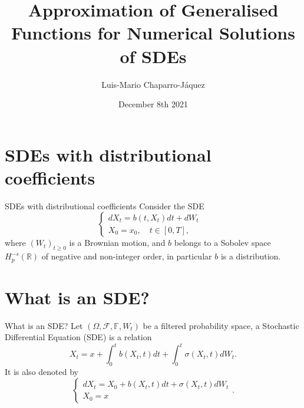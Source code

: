\documentclass{beamer}
\title{Approximation of Generalised Functions for Numerical Solutions of SDEs}
\author{Luis-Mario Chaparro-Jáquez}
\institute{University of Leeds\\School of Mathematics}
\date{December 8th 2021}
\begin{document}
\frame{\titlepage}
\frame{\tableofcontents}
\section{SDEs with distributional coefficients}
\begin{frame}{SDEs with distributional coefficients}
        Consider the SDE%
        \begin{equation*}
                \label{eq:distributional_sde}
                \begin{cases}
                        dX_t = b(t, X_t) dt + dW_t
                        &
                        \\
                        X_0 = x_0, \quad t \in [0,T],
                \end{cases}
        \end{equation*}
        where
        $(W_t)_{t \geq 0}$
        is a Brownian motion, and
        $b$
        belongs to a Sobolev space
        $H^{-s}_p(\mathbb{R})$
        of negative and non-integer order, in particular
        $b$
is a distribution.
\end{frame}

\section{What is an SDE?}
\begin{frame}{What is an SDE?}
        Let
        $ (\Omega, \mathcal{F}, \mathbb{F}, W_{t}) $
        be a filtered probability space, a Stochastic Differential Equation (SDE) is a relation
        \begin{equation*}
                \label{eq:sde}
                X_{t} = x + \int_{0}^{t} b(X_{t}, t) dt + \int_{0}^{t} \sigma(X_{t}, t) dW_{t}.
        \end{equation*}
        \pause
        {\color{red}
        It is also denoted by
        \begin{equation*}
                \begin{cases}
                        dX_{t} = X_{0} + b(X_{t}, t) dt + \sigma(X_{t}, t) dW_{t}
                        \\
                        X_0 = x
                \end{cases}.
        \end{equation*}
        }

\end{frame}
\end{document}
